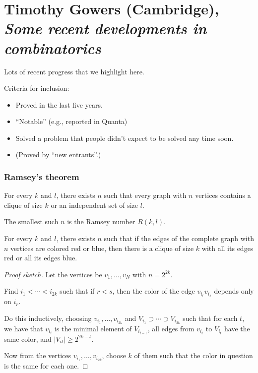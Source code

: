 \documentclass[reqno]{amsart} 
\begin{document}
\part{Timothy Gowers (Cambridge), \emph{Some recent developments in combinatorics}}

Lots of recent progress that we highlight here.

Criteria for inclusion:
\begin{itemize}
\item Proved in the last five years.
\item ``Notable'' (e.g., reported in Quanta)
\item Solved a problem that people didn't expect to be solved any time soon.
\item (Proved by ``new entrants''.)
\end{itemize}

\section{Ramsey's theorem}

\begin{theorem}
  For every $k$ and $l$, there exists $n$ such that every graph with $n$ vertices contains a clique of size $k$ or an independent set of size $l$.
\end{theorem}

The smallest such $n$ is the Ramsey number $R(k, l)$.


\begin{theorem}
  For every $k$ and $l$, there exists $n$ such that if the edges of the complete graph with $n$ vertices are colored red or blue, then there is a clique of size $k$ with all its edges red or all its edges blue.
\end{theorem}
\begin{proof}[Proof sketch]
  Let the vertices be $v_1, \dotsc, v_N$ with $n = 2^{2 k}$.

  Find $i_1 < \dotsb < i_{2 k}$ such that if $r < s$, then the color of the edge $v_{i_r} v_{i_s}$ depends only on $i_r$.

  Do this inductively, choosing $v_{i_1}, \dotsc, v_{i_{2 k}}$ and $V_{i_1} \supset \dotsb \supset V_{i_{2 k}}$ such that for each $t$, we have that $v_{i_t}$ is the minimal element of $V_{i_{t - 1}}$, all edges from $v_{i_t}$ to $V_{i_t}$ have the same color, and $\lvert V_{i t} \rvert \geq 2^{2 k - t}$.

  Now from the vertices $v_{i_1}, \dotsc, v_{i_{2 k}}$, choose $k$ of them such that the color in question is the same for each one.
\end{proof}
\end{document}
